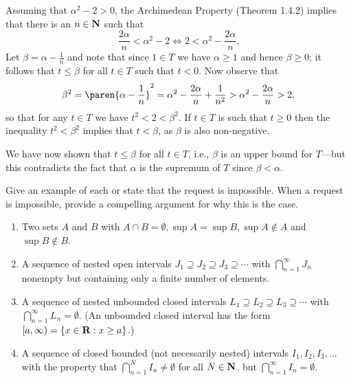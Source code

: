 \documentclass{lew98_solutions}
\begin{document}
\begin{solution}
    Assuming that \( \alpha^2 - 2 > 0 \), the Archimedean Property (Theorem 1.4.2) implies that there is an \( n \in \mathbf{N} \) such that
    \[
        \frac{2 \alpha}{n} < \alpha^2 - 2 \iff 2 < \alpha^2 - \frac{2 \alpha}{n}.
    \]
    Let \( \beta = \alpha - \tfrac{1}{n} \) and note that since \( 1 \in T \) we have \( \alpha \geq 1 \) and hence \( \beta \geq 0 \); it follows that \( t \leq \beta \) for all \( t \in T \) such that \( t < 0 \). Now observe that
    \[
        \beta^2 = \paren{ \alpha - \frac{1}{n} }^2 = \alpha^2 - \frac{2 \alpha}{n} + \frac{1}{n^2} > \alpha^2 - \frac{2 \alpha}{n} > 2,
    \]
    so that for any \( t \in T \) we have \( t^2 < 2 < \beta^2 \). If \( t \in T \) is such that \( t \geq 0 \) then the inequality \( t^2 < \beta^2 \) implies that \( t < \beta \), as \( \beta \) is also non-negative.
    
    We have now shown that \( t \leq \beta \) for all \( t \in T \), i.e., \( \beta \) is an upper bound for \( T \)---but this contradicts the fact that \( \alpha \) is the supremum of \( T \) since \( \beta < \alpha \).
\end{solution}

\begin{exercise}
\label{ex:1.4.8}
    Give an example of each or state that the request is impossible. When a request is impossible, provide a compelling argument for why this is the case.
    \begin{enumerate}
        \item Two sets \( A \) and \( B \) with \( A \cap B = \emptyset, \sup A = \sup B, \sup A \not\in A \) and \( \sup B \not\in B \).

        \item A sequence of nested open intervals \( J_1 \supseteq J_2 \supseteq J_3 \supseteq \cdots \) with \( \bigcap_{n=1}^{\infty} J_n \) nonempty but containing only a finite number of elements.

        \item A sequence of nested unbounded closed intervals \( L_1 \supseteq L_2 \supseteq L_3 \supseteq \cdots \) with \( \bigcap_{n=1}^{\infty} L_n = \emptyset \). (An unbounded closed interval has the form \( [a, \infty) = \{ x \in \mathbf{R} : x \geq a \} \).)

        \item A sequence of closed bounded (not necessarily nested) intervals \( I_1, I_2, I_3, \ldots \) with the property that \( \bigcap_{n=1}^N I_n \neq \emptyset \) for all \( N \in \mathbf{N} \), but \( \bigcap_{n=1}^{\infty} I_n = \emptyset \).
    \end{enumerate}
\end{exercise}
\end{document}
